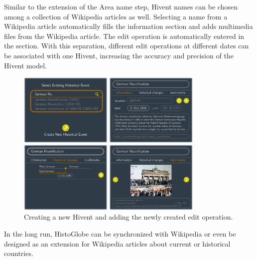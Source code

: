Similar to the extension of the Area name step, Hivent names can be chosen among a collection of Wikipedia articles as well. Selecting a name from a Wikipedia article automatically fills the information section and adds multimedia files from the Wikipedia article. The edit operation is automatically entered in the section. With this separation, different edit operations at different dates can be associated with one Hivent, increasing the accuracy and precision of the Hivent model.

\begin{figure}[ht]
  \centering
  \includegraphics[width = 0.8\textwidth]{graphics/extensions/new_hivent_box}
  \caption{Creating a new Hivent and adding the newly created edit operation.}
  \label{fig:uncertainty_new_hivent_box}
\end{figure}

In the long run, HistoGlobe can be synchronized with Wikipedia or even be designed as an extension for Wikipedia articles about current or historical countries.




